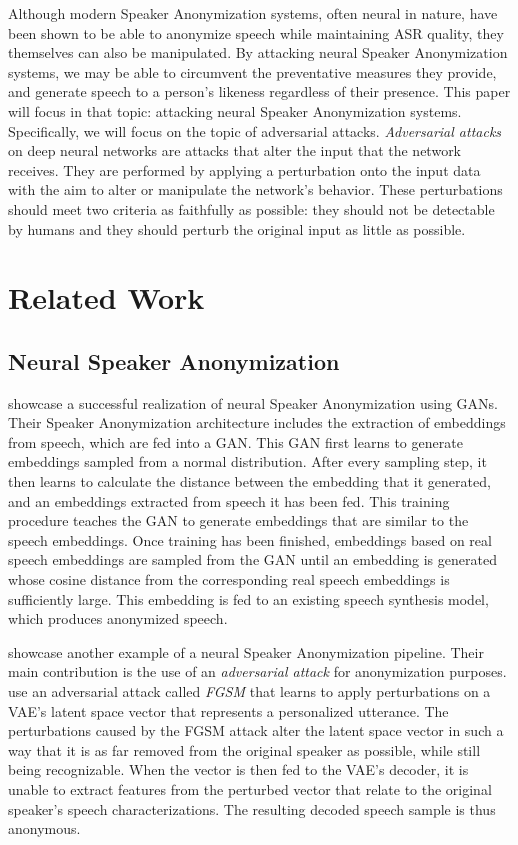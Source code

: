\documentclass[11pt]{article}
\begin{document}
Although modern Speaker Anonymization systems, often neural in nature, have been shown to be able to anonymize speech while maintaining ASR quality, they themselves can also be manipulated.
By attacking neural Speaker Anonymization systems, we may be able to circumvent the preventative measures they provide, and generate speech to a person's likeness regardless of their presence.
This paper will focus in that topic: attacking neural Speaker Anonymization systems.
Specifically, we will focus on the topic of adversarial attacks.
\textit{Adversarial attacks} on deep neural networks are attacks that alter the input that the network receives.
They are performed by applying a perturbation onto the input data with the aim to alter or manipulate the network's behavior.
These perturbations should meet two criteria as faithfully as possible: they should not be detectable by humans and they should perturb the original input as little as possible.

\section{Related Work}
\subsection{Neural Speaker Anonymization}
\citet{meyer2023anonymizing} showcase a successful realization of neural Speaker Anonymization using GANs.
Their Speaker Anonymization architecture includes the extraction of embeddings from speech, which are fed into a GAN.
This GAN first learns to generate embeddings sampled from a normal distribution.
After every sampling step, it then learns to calculate the distance between the embedding that it generated, and an embeddings extracted from speech it has been fed.
This training procedure teaches the GAN to generate embeddings that are similar to the speech embeddings.
Once training has been finished, embeddings based on real speech embeddings are sampled from the GAN until an embedding is generated whose cosine distance from the corresponding real speech embeddings is sufficiently large.
This embedding is fed to an existing speech synthesis model, which produces anonymized speech.

\citet{shihao2024adversarial} showcase another example of a neural Speaker Anonymization pipeline.
Their main contribution is the use of an \textit{adversarial attack} for anonymization purposes.
\citeauthor{shihao2024adversarial} use an adversarial attack called \textit{FGSM} that learns to apply perturbations on a VAE's latent space vector that represents a personalized utterance.
The perturbations caused by the FGSM attack alter the latent space vector in such a way that it is as far removed from the original speaker as possible, while still being recognizable.
When the vector is then fed to the VAE's decoder, it is unable to extract features from the perturbed vector that relate to the original speaker's speech characterizations.
The resulting decoded speech sample is thus anonymous.
\end{document}
